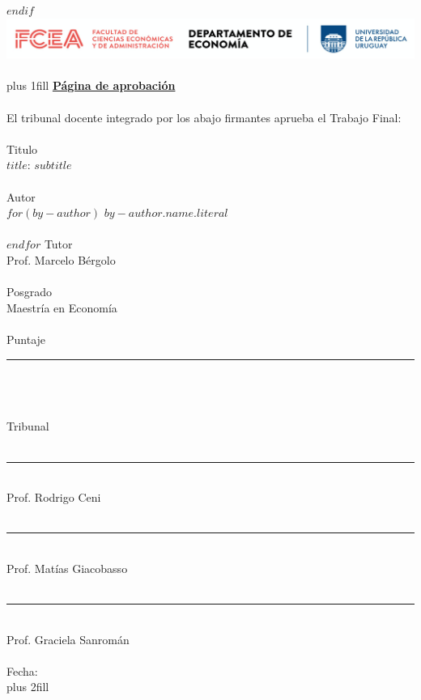 $endif$
\cleardoublepage
\thispagestyle{empty}
\includegraphics[width=\textwidth]{logo_udelar.png} \\~\\
\hbox{}\vskip 0cm plus 1fill
\Large \underline{\textbf{Página de aprobación}} \\~\\
\normalsize El tribunal docente integrado por los abajo firmantes aprueba el Trabajo Final: \\~\\
Titulo \\
$title$: $subtitle$ \\~\\
Autor \\
$for(by-author)$
$by-author.name.literal$ \\~\\
$endfor$
Tutor \\
Prof. Marcelo Bérgolo \\~\\
Posgrado \\
Maestría en Economía \\~\\
Puntaje \\
\rule{3cm}{0.4pt} \\~\\~\\
Tribunal \\~\\
\rule{9cm}{0.4pt} \\
Prof. Rodrigo Ceni \\~\\
\rule{9cm}{0.4pt} \\
Prof. Matías Giacobasso \\~\\
\rule{9cm}{0.4pt} \\
Prof. Graciela Sanromán \\~\\
Fecha: \\
\hbox{}\vskip 0cm plus 2fill
\newpage
